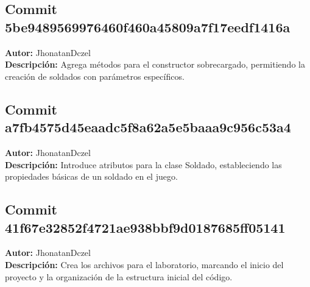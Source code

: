 \subsection*{Commit 5be9489569976460f460a45809a7f17eedf1416a}
\textbf{Autor:} JhonatanDczel \\
\textbf{Descripción:} Agrega métodos para el constructor sobrecargado, permitiendo la creación de soldados con parámetros específicos.

\subsection*{Commit a7fb4575d45eaadc5f8a62a5e5baaa9c956c53a4}
\textbf{Autor:} JhonatanDczel \\
\textbf{Descripción:} Introduce atributos para la clase Soldado, estableciendo las propiedades básicas de un soldado en el juego.

\subsection*{Commit 41f67e32852f4721ae938bbf9d0187685ff05141}
\textbf{Autor:} JhonatanDczel \\
\textbf{Descripción:} Crea los archivos para el laboratorio, marcando el inicio del proyecto y la organización de la estructura inicial del código.
